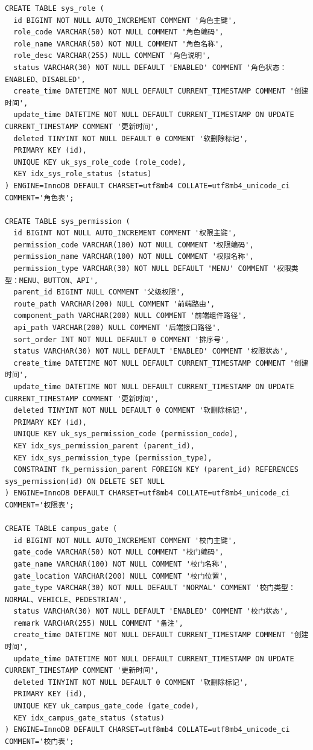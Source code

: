 \begin{lstlisting}[style=sqlstyle]
CREATE TABLE sys_role (
  id BIGINT NOT NULL AUTO_INCREMENT COMMENT '角色主键',
  role_code VARCHAR(50) NOT NULL COMMENT '角色编码',
  role_name VARCHAR(50) NOT NULL COMMENT '角色名称',
  role_desc VARCHAR(255) NULL COMMENT '角色说明',
  status VARCHAR(30) NOT NULL DEFAULT 'ENABLED' COMMENT '角色状态：ENABLED、DISABLED',
  create_time DATETIME NOT NULL DEFAULT CURRENT_TIMESTAMP COMMENT '创建时间',
  update_time DATETIME NOT NULL DEFAULT CURRENT_TIMESTAMP ON UPDATE CURRENT_TIMESTAMP COMMENT '更新时间',
  deleted TINYINT NOT NULL DEFAULT 0 COMMENT '软删除标记',
  PRIMARY KEY (id),
  UNIQUE KEY uk_sys_role_code (role_code),
  KEY idx_sys_role_status (status)
) ENGINE=InnoDB DEFAULT CHARSET=utf8mb4 COLLATE=utf8mb4_unicode_ci COMMENT='角色表';

CREATE TABLE sys_permission (
  id BIGINT NOT NULL AUTO_INCREMENT COMMENT '权限主键',
  permission_code VARCHAR(100) NOT NULL COMMENT '权限编码',
  permission_name VARCHAR(100) NOT NULL COMMENT '权限名称',
  permission_type VARCHAR(30) NOT NULL DEFAULT 'MENU' COMMENT '权限类型：MENU、BUTTON、API',
  parent_id BIGINT NULL COMMENT '父级权限',
  route_path VARCHAR(200) NULL COMMENT '前端路由',
  component_path VARCHAR(200) NULL COMMENT '前端组件路径',
  api_path VARCHAR(200) NULL COMMENT '后端接口路径',
  sort_order INT NOT NULL DEFAULT 0 COMMENT '排序号',
  status VARCHAR(30) NOT NULL DEFAULT 'ENABLED' COMMENT '权限状态',
  create_time DATETIME NOT NULL DEFAULT CURRENT_TIMESTAMP COMMENT '创建时间',
  update_time DATETIME NOT NULL DEFAULT CURRENT_TIMESTAMP ON UPDATE CURRENT_TIMESTAMP COMMENT '更新时间',
  deleted TINYINT NOT NULL DEFAULT 0 COMMENT '软删除标记',
  PRIMARY KEY (id),
  UNIQUE KEY uk_sys_permission_code (permission_code),
  KEY idx_sys_permission_parent (parent_id),
  KEY idx_sys_permission_type (permission_type),
  CONSTRAINT fk_permission_parent FOREIGN KEY (parent_id) REFERENCES sys_permission(id) ON DELETE SET NULL
) ENGINE=InnoDB DEFAULT CHARSET=utf8mb4 COLLATE=utf8mb4_unicode_ci COMMENT='权限表';

CREATE TABLE campus_gate (
  id BIGINT NOT NULL AUTO_INCREMENT COMMENT '校门主键',
  gate_code VARCHAR(50) NOT NULL COMMENT '校门编码',
  gate_name VARCHAR(100) NOT NULL COMMENT '校门名称',
  gate_location VARCHAR(200) NULL COMMENT '校门位置',
  gate_type VARCHAR(30) NOT NULL DEFAULT 'NORMAL' COMMENT '校门类型：NORMAL、VEHICLE、PEDESTRIAN',
  status VARCHAR(30) NOT NULL DEFAULT 'ENABLED' COMMENT '校门状态',
  remark VARCHAR(255) NULL COMMENT '备注',
  create_time DATETIME NOT NULL DEFAULT CURRENT_TIMESTAMP COMMENT '创建时间',
  update_time DATETIME NOT NULL DEFAULT CURRENT_TIMESTAMP ON UPDATE CURRENT_TIMESTAMP COMMENT '更新时间',
  deleted TINYINT NOT NULL DEFAULT 0 COMMENT '软删除标记',
  PRIMARY KEY (id),
  UNIQUE KEY uk_campus_gate_code (gate_code),
  KEY idx_campus_gate_status (status)
) ENGINE=InnoDB DEFAULT CHARSET=utf8mb4 COLLATE=utf8mb4_unicode_ci COMMENT='校门表';


\end{lstlisting}
